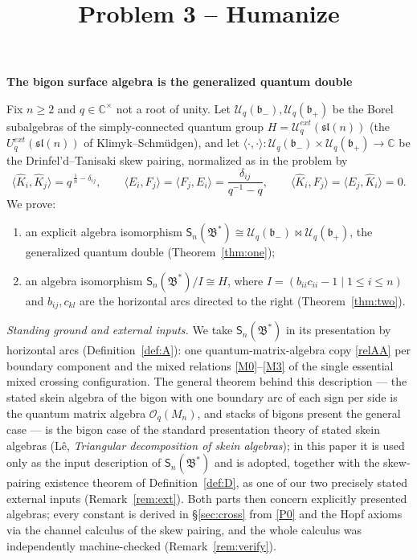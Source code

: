 \documentclass[11pt]{article}
\theoremstyle{definition}
\theoremstyle{remark}
\newcommand{\la}{\langle}
\newcommand{\ra}{\rangle}
\newcommand{\C}{\mathbb{C}}
\newcommand{\Uq}{\mathcal{U}_q}
\newcommand{\bp}{\mathfrak{b}_+}
\newcommand{\bm}{\mathfrak{b}_-}
\newcommand{\B}{\mathfrak{B}}
\newcommand{\Sn}{\mathsf{S}_n}
\newcommand{\del}{\delta}
\newcommand{\ptn}{\bowtie}
\newcommand{\hK}{\hat K}
\begin{document}
\title{Problem 3 -- Humanize}
\author{}
\date{}
\maketitle


\begin{center}
{\LARGE\bfseries The bigon surface algebra is the generalized quantum
double}
\end{center}

\bigskip
\noindent
Fix $n\ge2$ and $q\in\C^\times$ not a root of unity.  Let
$\Uq(\bm),\Uq(\bp)$ be the Borel subalgebras of the simply-connected
quantum group $H=\Uq^{ext}(\mathfrak{sl}(n))$ (the
$U_q^{ext}(\mathfrak{sl}(n))$ of Klimyk--Schm\"udgen), and let
$\la\cdot,\cdot\ra:\Uq(\bm)\times\Uq(\bp)\to\C$ be the
Drinfel'd--Tanisaki skew pairing, normalized as in the problem by
\begin{equation}
\la\hK_i,\hK_j\ra=q^{\,\frac1n-\del_{ij}},\qquad
\la E_i,F_j\ra=\la F_j,E_i\ra=\frac{\del_{ij}}{q^{-1}-q},\qquad
\la\hK_i,F_j\ra=\la E_j,\hK_i\ra=0 .
\label{P0}\tag{P0}
\end{equation}
We prove:
\begin{enumerate}[label=(\arabic*),leftmargin=2em]
\item an explicit algebra isomorphism
  $\Sn(\B^*)\cong\Uq(\bm)\ptn\Uq(\bp)$, the generalized quantum double
  (Theorem~\ref{thm:one});
\item an algebra isomorphism $\Sn(\B^*)/I\cong H$, where
  $I=(b_{ii}c_{ii}-1\mid 1\le i\le n)$ and $b_{ij},c_{kl}$ are the
  horizontal arcs directed to the right (Theorem~\ref{thm:two}).
\end{enumerate}

\noindent\emph{Standing ground and external inputs.}  We take
$\Sn(\B^*)$ in its presentation by horizontal arcs
(Definition~\ref{def:A}): one quantum-matrix-algebra copy
\eqref{relAA} per boundary component and the mixed relations
\eqref{M0}--\eqref{M3} of the single essential mixed crossing
configuration.  The general theorem behind this description — the
stated skein algebra of the bigon with one boundary arc of each sign
per side is the quantum matrix algebra $\mathcal O_q(M_n)$, and
stacks of bigons present the general case — is the bigon case of the
standard presentation theory of stated skein algebras (L\^e,
\emph{Triangular decomposition of skein algebras}); in this paper it
is used only as the input description of $\Sn(\B^*)$ and is adopted,
together with the skew-pairing existence theorem of
Definition~\ref{def:D}, as one of our two precisely stated external
inputs (Remark~\ref{rem:ext}).  Both parts then concern explicitly
presented algebras; every constant is derived in \S\ref{sec:cross}
from \eqref{P0} and the Hopf axioms via the channel calculus of the
skew pairing, and the whole calculus was independently
machine-checked (Remark~\ref{rem:verify}).
\end{document}
